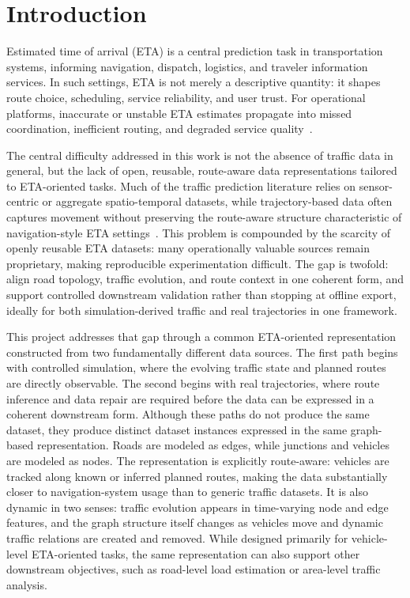 \chapter{Introduction}

Estimated time of arrival (ETA) is a central prediction task in transportation systems, informing navigation, dispatch, logistics, and traveler information services. In such settings, ETA is not merely a descriptive quantity: it shapes route choice, scheduling, service reliability, and user trust. For operational platforms, inaccurate or unstable ETA estimates propagate into missed coordination, inefficient routing, and degraded service quality~\cite{modica2024eta}.

The central difficulty addressed in this work is not the absence of traffic data in general, but the lack of open, reusable, route-aware data representations tailored to ETA-oriented tasks. Much of the traffic prediction literature relies on sensor-centric or aggregate spatio-temporal datasets, while trajectory-based data often captures movement without preserving the route-aware structure characteristic of navigation-style ETA settings~\cite{yu2017trafficpred}. This problem is compounded by the scarcity of openly reusable ETA datasets: many operationally valuable sources remain proprietary, making reproducible experimentation difficult. The gap is twofold: align road topology, traffic evolution, and route context in one coherent form, and support controlled downstream validation rather than stopping at offline export, ideally for both simulation-derived traffic and real trajectories in one framework.

This project addresses that gap through a common ETA-oriented representation constructed from two fundamentally different data sources. The first path begins with controlled simulation, where the evolving traffic state and planned routes are directly observable. The second begins with real trajectories, where route inference and data repair are required before the data can be expressed in a coherent downstream form. Although these paths do not produce the same dataset, they produce distinct dataset instances expressed in the same graph-based representation. Roads are modeled as edges, while junctions and vehicles are modeled as nodes. The representation is explicitly route-aware: vehicles are tracked along known or inferred planned routes, making the data substantially closer to navigation-system usage than to generic traffic datasets. It is also dynamic in two senses: traffic evolution appears in time-varying node and edge features, and the graph structure itself changes as vehicles move and dynamic traffic relations are created and removed. While designed primarily for vehicle-level ETA-oriented tasks, the same representation can also support other downstream objectives, such as road-level load estimation or area-level traffic analysis.

